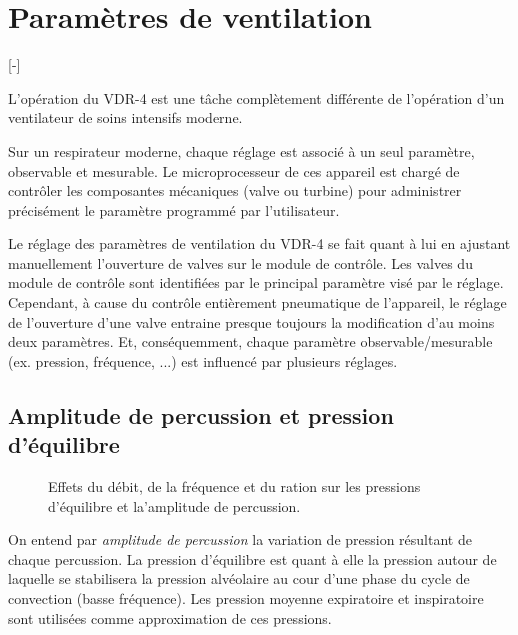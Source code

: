\chapter{Paramètres de ventilation}

[-\baselineskip]

L'opération du VDR-4 est une tâche complètement différente de
l'opération d'un ventilateur de soins intensifs moderne.

Sur un respirateur moderne, chaque réglage est associé à un seul
paramètre, observable et mesurable. Le microprocesseur de ces appareil
est chargé de contrôler les composantes mécaniques (valve ou turbine)
pour administrer précisément le paramètre programmé par l'utilisateur.

Le réglage des paramètres de ventilation du VDR-4 se fait quant à lui
en ajustant manuellement l'ouverture de valves sur le module de
contrôle.  Les valves du module de contrôle sont identifiées par le
principal paramètre visé par le réglage.  Cependant, à cause du
contrôle entièrement pneumatique de l'appareil, le réglage de
l'ouverture d'une valve entraine presque toujours la modification d'au
moins deux paramètres. Et, conséquemment, chaque paramètre
observable/mesurable (ex. pression, fréquence, ...) est influencé par
plusieurs réglages.

\section[Amplitude de percussion]{Amplitude de percussion et pression d'équilibre}

\begin{figure}
	\centering
	
	\caption{Effets du débit, de la fréquence et du ration \ie{}
	sur les pressions d'équilibre et la'amplitude de percussion.}
\end{figure}

On entend par	\emph{amplitude de percussion} la variation de pression
	résultant de chaque percussion. La pression d'équilibre est quant à
	elle la pression autour de laquelle se stabilisera la pression
	alvéolaire au cour d'une phase du cycle de convection (basse
	fréquence). Les pression moyenne expiratoire et inspiratoire sont
	utilisées comme approximation de ces pressions.

